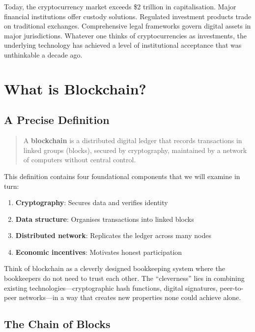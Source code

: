 \documentclass[11pt,a4paper]{article}
\newcommand{\keyword}[1]{\textbf{\textcolor{AccentOrange}{#1}}}
\begin{document}
Today, the cryptocurrency market exceeds \$2 trillion in capitalisation. Major financial institutions offer custody solutions. Regulated investment products trade on traditional exchanges. Comprehensive legal frameworks govern digital assets in major jurisdictions. Whatever one thinks of cryptocurrencies as investments, the underlying technology has achieved a level of institutional acceptance that was unthinkable a decade ago.

\section{What is Blockchain?}

\subsection{A Precise Definition}

\begin{quote}
A \keyword{blockchain} is a distributed digital ledger that records transactions in linked groups (blocks), secured by cryptography, maintained by a network of computers without central control.
\end{quote}

This definition contains four foundational components that we will examine in turn:

\begin{enumerate}
    \item \textbf{Cryptography}: Secures data and verifies identity
    \item \textbf{Data structure}: Organises transactions into linked blocks
    \item \textbf{Distributed network}: Replicates the ledger across many nodes
    \item \textbf{Economic incentives}: Motivates honest participation
\end{enumerate}

Think of blockchain as a cleverly designed bookkeeping system where the bookkeepers do not need to trust each other. The ``cleverness'' lies in combining existing technologies---cryptographic hash functions, digital signatures, peer-to-peer networks---in a way that creates new properties none could achieve alone.

\subsection{The Chain of Blocks}
\end{document}
